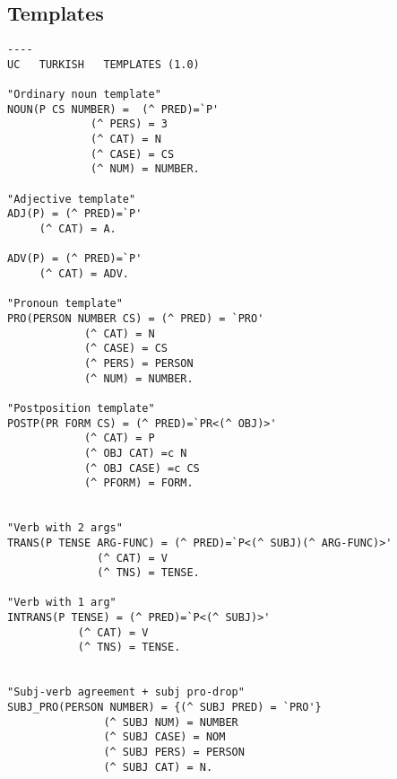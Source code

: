 \subsection{Templates}
\begin{lstlisting}
----
UC   TURKISH   TEMPLATES (1.0)
	
"Ordinary noun template"
NOUN(P CS NUMBER) =  (^ PRED)=`P'
		     (^ PERS) = 3
		     (^ CAT) = N
	 	     (^ CASE) = CS
		     (^ NUM) = NUMBER.      
	
"Adjective template"
ADJ(P) = (^ PRED)=`P'
	 (^ CAT) = A.
		
ADV(P) = (^ PRED)=`P'
	 (^ CAT) = ADV.
	
"Pronoun template"	      
PRO(PERSON NUMBER CS) = (^ PRED) = `PRO'
			(^ CAT) = N
			(^ CASE) = CS
			(^ PERS) = PERSON
			(^ NUM) = NUMBER.
	
"Postposition template"	      
POSTP(PR FORM CS) = (^ PRED)=`PR<(^ OBJ)>'
		    (^ CAT) = P
		    (^ OBJ CAT) =c N
		    (^ OBJ CASE) =c CS
		    (^ PFORM) = FORM.

	
"Verb with 2 args"
TRANS(P TENSE ARG-FUNC) = (^ PRED)=`P<(^ SUBJ)(^ ARG-FUNC)>'
			  (^ CAT) = V
			  (^ TNS) = TENSE.
	
"Verb with 1 arg"
INTRANS(P TENSE) = (^ PRED)=`P<(^ SUBJ)>'
		   (^ CAT) = V
		   (^ TNS) = TENSE.
	
	
"Subj-verb agreement + subj pro-drop"	    
SUBJ_PRO(PERSON NUMBER) = {(^ SUBJ PRED) = `PRO'} 
			   (^ SUBJ NUM) = NUMBER
			   (^ SUBJ CASE) = NOM
			   (^ SUBJ PERS) = PERSON
			   (^ SUBJ CAT) = N.
\end{lstlisting}


